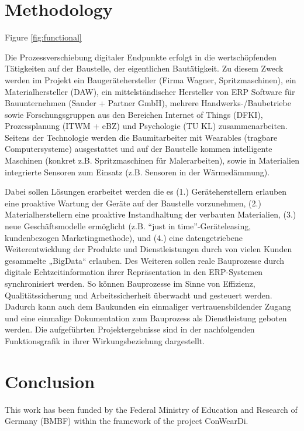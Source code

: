 \section{Methodology}
Figure \ref{fig:functional}



Die Prozessverschiebung digitaler Endpunkte erfolgt in die wertschöpfenden Tätigkeiten auf der Baustelle, der eigentlichen Bautätigkeit. Zu diesem Zweck werden im Projekt ein Baugerätehersteller (Firma Wagner, Spritzmaschinen), ein Materialhersteller (DAW), ein mittelständischer Hersteller von ERP Software für Bauunternehmen (Sander + Partner GmbH), mehrere Handwerks-/Baubetriebe sowie Forschungsgruppen aus den Bereichen Internet of Things (DFKI), Prozessplanung (ITWM + eBZ) und Psychologie (TU KL) zusammenarbeiten. Seitens der Technologie werden die Baumitarbeiter mit Wearables (tragbare Computersysteme) ausgestattet und auf der Baustelle kommen intelligente Maschinen (konkret z.B. Spritzmaschinen für Malerarbeiten), sowie in Materialien integrierte Sensoren zum Einsatz (z.B. Sensoren in der Wärmedämmung).

Dabei sollen Lösungen erarbeitet werden die es (1.) Geräteherstellern erlauben eine proaktive Wartung der Geräte auf der Baustelle vorzunehmen, (2.) Materialherstellern eine proaktive Instandhaltung der verbauten Materialien, (3.) neue Geschäftsmodelle ermöglicht (z.B. “just in time”-Geräteleasing, kundenbezogen Marketingmethode), und (4.) eine datengetriebene Weiterentwicklung der Produkte und Dienstleistungen durch von vielen Kunden gesammelte „BigData“ erlauben. Des Weiteren sollen reale Bauprozesse durch digitale Echtzeitinformation ihrer Repräsentation in den ERP-Systemen synchronisiert werden. So können Bauprozesse im Sinne von Effizienz, Qualitätssicherung und Arbeitssicherheit überwacht und gesteuert werden. Dadurch kann auch dem Baukunden ein einmaliger vertrauensbildender Zugang und eine einmalige Dokumentation zum Bauprozess als Dienstleistung geboten werden.
Die aufgeführten Projektergebnisse sind in der nachfolgenden Funktionsgrafik in ihrer Wirkungsbeziehung dargestellt.


\section{Conclusion}


\begin{acks}
  This work has been funded by the Federal Ministry of Education and Research of Germany (BMBF) within the framework of the project ConWearDi.
\end{acks}
